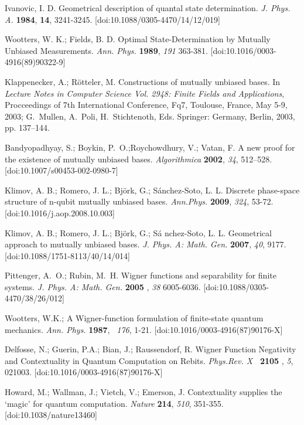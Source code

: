\documentclass{article}
\begin{document}
\begin{thebibliography}{99}
 Ivanovic, I. D. Geometrical description of quantal state
determination. \textit{J. Phys. A.} \textbf{1984}, \textbf{14}, 3241-3245.
[doi:10.1088/0305-4470/14/12/019]

 Wootters, W. K.; Fields, B. D. Optimal State-Determination
by Mutually Unbiased Measurements. \textit{Ann. Phys.} \textbf{1989}, 
\textit{191} 363-381. [doi:10.1016/0003-4916(89)90322-9]

 Klappenecker, A.; R{\"{o}}tteler, M. Constructions of
mutually unbiased bases. In \textit{Lecture Notes in Computer Science Vol.
2948: Finite Fields and Applications}, Procceedings of 7th International
Conference, Fq7, Toulouse, France, May 5-9, 2003; G.~Mullen, A.~Poli,
H.~Stichtenoth, Eds. Springer: Germany, Berlin, 2003, pp. 137--144.

 Bandyopadhyay, S.; Boykin, P.~O.;Roychowdhury,
V.; Vatan, F. A new proof for the existence of mutually unbiased bases. 
\textit{Algorithmica} \textbf{2002}, \textit{34}, 512--528.
[doi:10.1007/s00453-002-0980-7]

 Klimov, A. B.; Romero, J. L.; Bj\"{o}rk, G.; S\'{a}nchez-Soto,
L. L. Discrete phase-space structure of n-qubit mutually unbiased bases. 
\textit{Ann.Phys.} \textbf{2009}, \textit{324}, 53-72.
[doi:10.1016/j.aop.2008.10.003]

 Klimov, A. B.; Romero, J. L.; Bj{\"{o}}rk, G.; S{\'{a}}%
nchez-Soto, L. L. Geometrical approach to mutually unbiased bases. \textit{%
J. Phys. A: Math. Gen.} \textbf{2007}, \textit{40}, 9177.
[doi:10.1088/1751-8113/40/14/014]

 Pittenger, A.~O.; Rubin, M.~H. Wigner functions and
separability for finite systems. \textit{J. Phys. A: Math. Gen.} \textbf{2005%
}, \textit{38} 6005-6036. [doi:10.1088/0305-4470/38/26/012]

 Wootters, W.K.; A Wigner-function formulation of
finite-state quantum mechanics. \textit{Ann. Phys.} \textbf{1987}, \textit{\
176}, 1-21. [doi:10.1016/0003-4916(87)90176-X]

 Delfosse, N.; Guerin, P.A.; Bian, J.; Raussendorf, R. Wigner
Function Negativity and Contextuality in Quantum Computation on Rebits. 
\textit{Phys.Rev. X} \textbf{\ 2105 }, \textit{5}, 021003.
[doi:10.1016/0003-4916(87)90176-X]

 Howard, M.; Wallman, J.; Vietch, V.; Emerson, J.
Contextuality supplies the `magic' for quantum computation. \textit{Nature}
\textbf{214}, \textit{510}, 351-355.  [doi:10.1038/nature13460]


\end{thebibliography}
\end{document}
